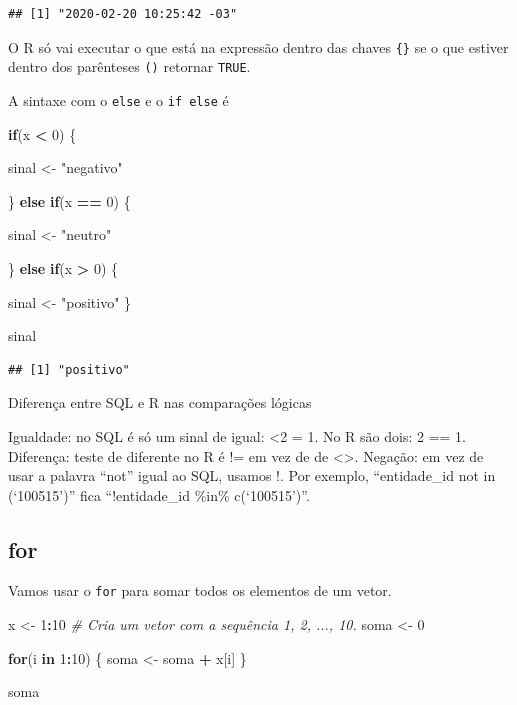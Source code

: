 \documentclass[
]{book}
\newenvironment{Shaded}{\begin{snugshade}}{\end{snugshade}}
\newcommand{\CommentTok}[1]{\textcolor[rgb]{0.56,0.35,0.01}{\textit{#1}}}
\newcommand{\ControlFlowTok}[1]{\textcolor[rgb]{0.13,0.29,0.53}{\textbf{#1}}}
\newcommand{\DecValTok}[1]{\textcolor[rgb]{0.00,0.00,0.81}{#1}}
\newcommand{\NormalTok}[1]{#1}
\newcommand{\OperatorTok}[1]{\textcolor[rgb]{0.81,0.36,0.00}{\textbf{#1}}}
\newcommand{\StringTok}[1]{\textcolor[rgb]{0.31,0.60,0.02}{#1}}
\begin{document}
\begin{verbatim}
## [1] "2020-02-20 10:25:42 -03"
\end{verbatim}

O R só vai executar o que está na expressão dentro das chaves \texttt{\{\}} se o que estiver dentro dos parênteses \texttt{()} retornar \texttt{TRUE}.

A sintaxe com o \texttt{else} e o \texttt{if\ else} é

\begin{Shaded}
\begin{Highlighting}[]
\ControlFlowTok{if}\NormalTok{(x }\OperatorTok{<}\StringTok{ }\DecValTok{0}\NormalTok{) \{}
  
\NormalTok{  sinal <{-}}\StringTok{ "negativo"}
  
\NormalTok{\} }\ControlFlowTok{else} \ControlFlowTok{if}\NormalTok{(x }\OperatorTok{==}\StringTok{ }\DecValTok{0}\NormalTok{) \{}
  
\NormalTok{  sinal <{-}}\StringTok{ "neutro"}
  
\NormalTok{\} }\ControlFlowTok{else} \ControlFlowTok{if}\NormalTok{(x }\OperatorTok{>}\StringTok{ }\DecValTok{0}\NormalTok{) \{}
  
\NormalTok{  sinal <{-}}\StringTok{ "positivo"}
\NormalTok{\}}

\NormalTok{sinal}
\end{Highlighting}
\end{Shaded}

\begin{verbatim}
## [1] "positivo"
\end{verbatim}

Diferença entre SQL e R nas comparações lógicas

Igualdade: no SQL é só um sinal de igual: \textless2 = 1. No R são dois: 2 == 1.
Diferença: teste de diferente no R é != em vez de de \textless\textgreater.
Negação: em vez de usar a palavra ``not'' igual ao SQL, usamos !. Por exemplo, ``entidade\_id not in (`100515')'' fica ``!entidade\_id \%in\% c(`100515')''.

\hypertarget{for}{%
\subsection{for}\label{for}}

Vamos usar o \texttt{for} para somar todos os elementos de um vetor.

\begin{Shaded}
\begin{Highlighting}[]
\NormalTok{x <{-}}\StringTok{ }\DecValTok{1}\OperatorTok{:}\DecValTok{10}   \CommentTok{\# Cria um vetor com a sequência 1, 2, ..., 10.}
\NormalTok{soma <{-}}\StringTok{ }\DecValTok{0}

\ControlFlowTok{for}\NormalTok{(i }\ControlFlowTok{in} \DecValTok{1}\OperatorTok{:}\DecValTok{10}\NormalTok{) \{}
\NormalTok{  soma <{-}}\StringTok{ }\NormalTok{soma }\OperatorTok{+}\StringTok{ }\NormalTok{x[i]}
\NormalTok{\}}

\NormalTok{soma}
\end{Highlighting}
\end{Shaded}
\end{document}
